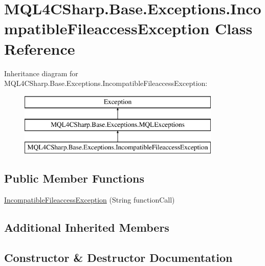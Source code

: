 \hypertarget{class_m_q_l4_c_sharp_1_1_base_1_1_exceptions_1_1_incompatible_fileaccess_exception}{}\section{M\+Q\+L4\+C\+Sharp.\+Base.\+Exceptions.\+Incompatible\+Fileaccess\+Exception Class Reference}
\label{class_m_q_l4_c_sharp_1_1_base_1_1_exceptions_1_1_incompatible_fileaccess_exception}
Inheritance diagram for M\+Q\+L4\+C\+Sharp.\+Base.\+Exceptions.\+Incompatible\+Fileaccess\+Exception\+:\begin{figure}[H]
\begin{center}
\leavevmode
\includegraphics[height=3.000000cm]{class_m_q_l4_c_sharp_1_1_base_1_1_exceptions_1_1_incompatible_fileaccess_exception}
\end{center}
\end{figure}
\subsection*{Public Member Functions}
\begin{DoxyCompactItemize}
\item 
\hyperlink{class_m_q_l4_c_sharp_1_1_base_1_1_exceptions_1_1_incompatible_fileaccess_exception_af921ef3ffa9239caa483afcfa73099dd}{Incompatible\+Fileaccess\+Exception} (String function\+Call)
\end{DoxyCompactItemize}
\subsection*{Additional Inherited Members}


\subsection{Constructor \& Destructor Documentation}
